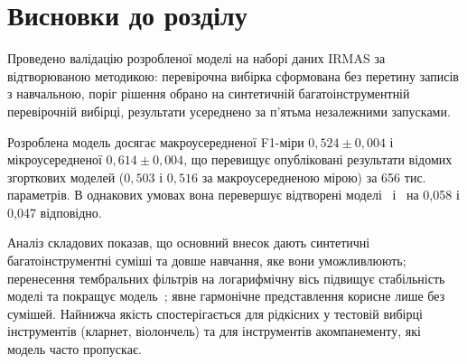 \section{Висновки до розділу}
\label{sec:ch4_conclusions}

Проведено валідацію розробленої моделі на наборі даних IRMAS за
відтворюваною методикою: перевірочна вибірка сформована без перетину
записів з навчальною, поріг рішення обрано на синтетичній
багатоінструментній перевірочній вибірці, результати усереднено за
п'ятьма незалежними запусками.

Розроблена модель досягає макроусередненої F1-міри $0{,}524 \pm 0{,}004$
і мікроусередненої $0{,}614 \pm 0{,}004$, що перевищує опубліковані
результати відомих згорткових моделей ($0{,}503$ і $0{,}516$ за
макроусередненою мірою) за 656 тис. параметрів. В однакових умовах
вона перевершує відтворені моделі~\cite{han2017} і~\cite{pons2017} на
0,058 і 0,047 відповідно.

Аналіз складових показав, що основний внесок дають синтетичні
багатоінструментні суміші та довше навчання, яке вони уможливлюють;
перенесення тембральних фільтрів на логарифмічну вісь підвищує
стабільність моделі та покращує модель~\cite{pons2017}; явне гармонічне
представлення корисне лише без сумішей. Найнижча якість спостерігається
для рідкісних у тестовій вибірці інструментів (кларнет, віолончель) та
для інструментів акомпанементу, які модель часто пропускає.
